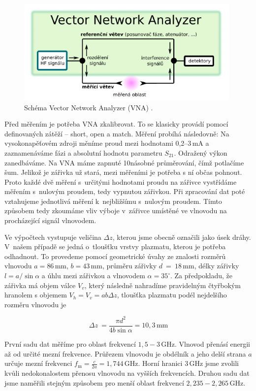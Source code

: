 \documentclass[a4paper,12pt]{article}
\begin{document}
\begin{figure}[h]
	\centering
	\includegraphics[width=110mm]{vna.png}
	\caption{Schéma Vector Network Analyzer (VNA) \cite{navod}.}
	\label{vna}
\end{figure}

Před měřením je potřeba VNA zkalibrovat. To se klasicky provádí pomocí definovaných
zátěží -- short, open a match. Měření probíhá následovně: Na vysokonapěťovém zdroji
měníme proud mezi hodnotami 0,2--3\,\si{\milli\ampere} a zaznamenáváme fázi a 
absolutní hodnotu parametru $S_{21}$. Odražený výkon zanedbáváme. Na VNA máme 
zapnuté 10násobné průměrování, 
čímž 
potlačíme
šum. Jelikož je zářivka už stará, mezi měřeními je potřeba s ní občas pohnout. 
Proto každé dvě měření s~určitými hodnotami proudu na zářivce vystřídáme měřením
s~nulovým proudem, tedy vypnutou zářivkou. Při zpracování dat poté vztahujeme jednotlivá
měření k~nejbližšímu s~nulovým proudem. Tímto způsobem tedy zkoumáme vliv výboje v~zářivce umístěné ve vlnovodu na procházející signál vlnovodem.

Ve výpočtech vystupuje veličina $\Delta z$, kterou jsme obecně označili jako 
úsek dráhy.
V~našem případě se jedná o~tloušťku vrstvy plazmatu, kterou je potřeba 
odhadnout. To provedeme
pomocí geometrické úvahy ze znalosti rozměrů vlnovodu $a = 
86$\,\si{\milli\meter}, $b = 
43$\,\si{\milli\meter},
průměru zářivky $d$~=~$18$\,\si{\milli\meter}, délky zářivky $l = 
a/\!\sin\alpha$ 
a úhlu mezi 
zářivkou a vlnovodem 
$\alpha = 35^{\circ}$. Za
předpokladu, že zářivka má objem válce $V_v$, který následně nahradíme 
pravidelným
čtyř\-bo\-kým hranolem s objemem $V_h = V_v =ab\Delta z$, tloušťka plazmatu 
podél 
nejdelšího rozměru vlnovodu je

\begin{equation}
	\Delta z~= \frac{\pi d^2}{4b\sin\alpha} = 10,3\,\si{\milli\meter}
\end{equation}

První sadu dat měříme pro oblast frekvencí $1,5\!-\!3$\,\si{\giga\hertz}. 
Vlnovod přenásí energii až od určité mezní frekvence. Průřezem vlnovodu je 
obdélník a jeho delší strana $a$ určuje mezní frekvenci $f_{\text{m}} = 
\frac{c}{2a} = 1,744\,\si{\giga\hertz}$. Horní hranici 3\,\si{\giga\hertz} jsme 
zvolili kvůli nedokonalostem přenosu vlnovodu na vyšších frekvencích. Druhou 
sadu dat 
jsme naměřili stejným způsobem pro menší oblast frekvencí 
$2,235\!-\!2,265$\,\si{\giga\hertz}.
\end{document}
